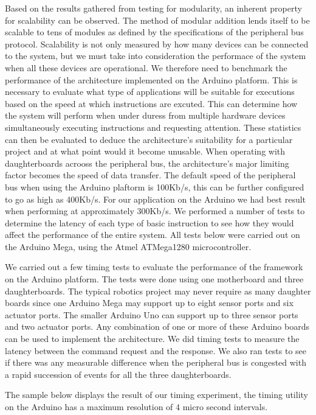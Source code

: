 Based on the results gathered from testing for modularity, an inherent property for scalability can be observed. The method of modular addition lends itself to be scalable to tens of modules as defined by the specifications of the peripheral bus protocol. Scalability is not only measured by how many devices can be connected to the system, but we must take into consideration the performace of the system when all these devices are operational. We therefore need to benchmark the performance of the architecture implemented on the Arduino platform. This is necessary to evaluate what type of applications will be suitable for executions based on the speed at which instructions are excuted. This can determine how the system will perform when under duress from multiple hardware devices simultaneously executing instructions and requesting attention. These statistics can then be evaluated to deduce the architecture's suitability for a particular project and at what point would it become unusable. When operating with daughterboards acrooss the peripheral bus, the \xten architecture's major limiting factor becomes the speed of data transfer. The default speed of the peripheral bus when using the Arduino plaftorm is 100Kb/s, this can be further configured to go as high as 400Kb/s. For our application on the Arduino we had best result when performing at approximately 300Kb/s. We performed a number of tests to determine the latency of each type of basic instruction to see how they would affect the performance of the entire system. All tests below were carried out on the Arduino Mega, using the Atmel \texttrademark ATMega1280 microcontroller.

We carried out a few timing tests to evaluate the performance of the \xten framework on the Arduino platform. The tests were done using one motherboard and three daughterboards. The typical robotics project may never require as many daughter boards since one Arduino Mega may support up to eight sensor ports and six actuator ports. The smaller Arduino Uno can support up to three sensor ports and two actuator ports. Any combination of one or more of these Arduino boards can be used to implement the \xten architecture.
We did timing tests to measure the latency between the command request and the response. We also ran tests to see if there was any measurable difference when the peripheral bus is congested with a rapid succession of events for all the three daughterboards.

The sample below displays the result of our timing experiment, the timing utility on the Arduino has a maximum resolution of 4 micro second intervals.


